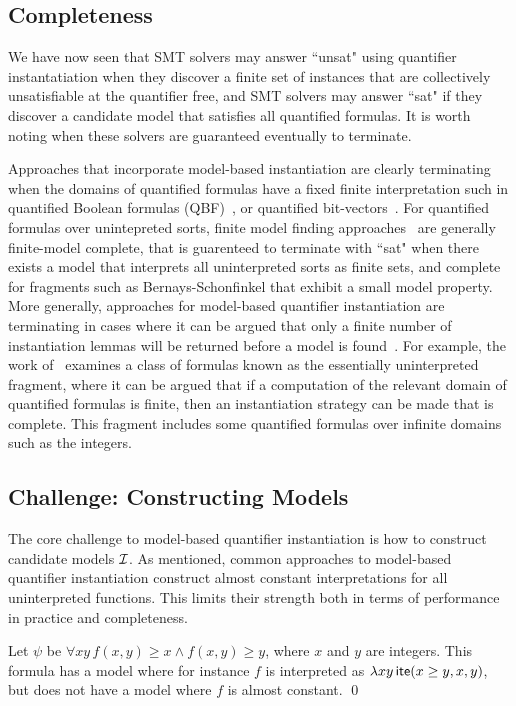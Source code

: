 \documentclass[oribibl]{llncs}
\begin{document}
\subsection{Completeness}
We have now seen that SMT solvers may answer ``unsat" using quantifier instantatiation
when they discover a finite set of instances that are collectively unsatisfiable at the quantifier free,
and SMT solvers may answer ``sat" if they discover a candidate model that satisfies all quantified formulas.
It is worth noting when these solvers are guaranteed eventually to terminate.

Approaches that incorporate model-based instantiation are clearly terminating
when the domains of quantified formulas have a fixed finite interpretation
such in quantified Boolean formulas (QBF)~\cite{janota2012solving},
or quantified bit-vectors~\cite{wintersteiger2013efficiently}.
For quantified formulas over unintepreted sorts,
finite model finding approaches~\cite{ReyEtAl-CADE-13} are generally finite-model complete,
that is guarenteed to terminate with ``sat" when there exists a model that interprets
all uninterpreted sorts as finite sets, and complete for fragments such as Bernays-Schonfinkel
that exhibit a small model property.
More generally, approaches for model-based quantifier instantiation are terminating in cases
where it can be argued that only a finite number of instantiation lemmas will be returned before 
a model is found~\cite{}.
For example, the work of~\cite{GeDeM-CAV-09} examines a class of formulas known as the essentially uninterpreted fragment,
where it can be argued that if a computation of the relevant domain of quantified formulas is finite,
then an instantiation strategy can be made that is complete.
This fragment includes some quantified formulas over infinite domains such as the integers.

\subsection{Challenge: Constructing Models}
The core challenge to model-based quantifier instantiation is how to construct candidate models $\mathcal{I}$.
As mentioned, common approaches to model-based quantifier instantiation
construct almost constant interpretations for all uninterpreted functions.
This limits their strength both in terms of performance in practice and completeness.

\begin{example}
Let $\psi$ be $\forall xy\, f( x, y ) \geq x \wedge f( x, y ) \geq y$, where $x$ and $y$ are integers.
This formula has a model where for instance $f$ is interpreted as $\lambda xy\, \mathsf{ite}( x \geq y, x, y )$,
but does not have a model where $f$ is almost constant.
\qed
\end{example}
\end{document}
